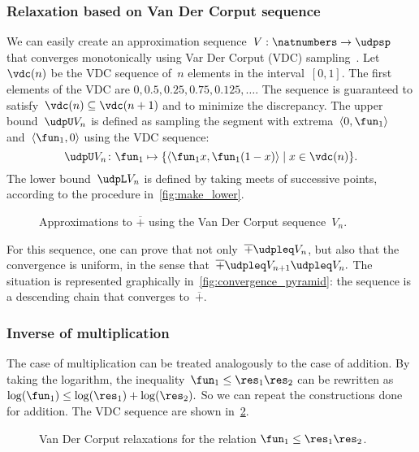 \subsubsection*{Relaxation based on Van Der Corput sequence}

We can easily create an approximation sequence~$V:\natnumbers\to\udpsp$
that converges monotonically using Var Der Corput (VDC) sampling~\cite[Section 5.2]{LaValle2006Planning}.
Let~$\vdc(n)$ be the VDC sequence of~$n$ elements in the interval~$[0,1]$.
The first elements of the VDC are $0,0.5,0.25,0.75,0.125,\dots$.
The sequence is guaranteed to satisfy~$\vdc(n)\subseteq\vdc(n+1)$
and to minimize the discrepancy.
The upper bound~$\udpU V_{n}$
is defined as sampling the segment with extrema~$\left\langle 0,\fun_{1}\right\rangle $
and~$\left\langle \fun_{1},0\right\rangle $ using the VDC sequence:
\[
    \udpU V_{n}\colon\fun_{1}\mapsto\{\left\langle \fun_{1}x,\fun_{1}(1-x)\right\rangle \mid x\in\vdc(n)\}.
\]
The lower bound~$\udpL V_{n}$ is defined by taking meets of successive
points, according to the procedure in~\cref{fig:make_lower}.

\begin{figure}[h]
    \centering
    \caption{Approximations to $\overline{+}$ using the Van Der
    Corput sequence~$V_{n}$.}
    \label{fig:Vn}
\end{figure}

For this sequence, one can prove that not only~$\overline{+}\udpleq V_{n}$,
but also that the convergence is uniform, in the sense that~$\overline{+}\udpleq V_{n+1}\udpleq V_{n}.$
The situation is represented graphically in~\cref{fig:convergence_pyramid}:
the sequence is a descending chain that converges to~$\overline{+}$.

\subsubsection{Inverse of multiplication}

The case of multiplication can be treated analogously to the case
of addition.
By taking the logarithm, the inequality~$\fun_{1}\leq\res_{1}\res_{2}$
can be rewritten as~$\log(\fun_{1})\leq\log(\res_{1})+\log(\res_{2}).$
So we can repeat the constructions done for addition.
The VDC sequence
are shown in~\cref{fig:approx_invmult}.

\begin{figure}[h]
    \centering
    \caption{Van Der Corput relaxations for the relation
        $\fun_{1}\leq\res_{1}\res_{2}$.}
    \label{fig:approx_invmult}
\end{figure}

